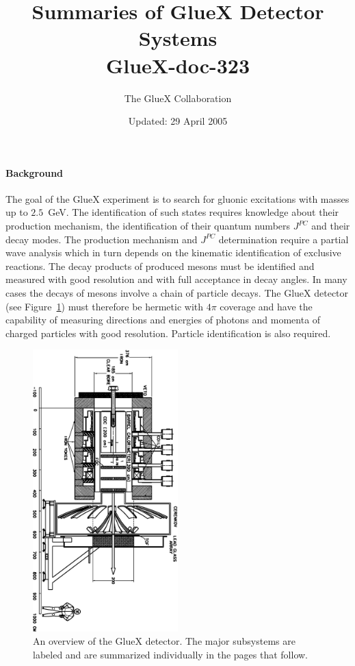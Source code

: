 
%
%
\title{Summaries of GlueX Detector Systems \\
\small{GlueX-doc-323} \\
}
%
\date{Updated: 29 April 2005}
%
\author{The GlueX Collaboration}
%

\maketitle
%
%
\paragraph{Background}
The goal of the GlueX experiment is to search for gluonic excitations
with masses up to $2.5$~GeV.  The identification of such states
requires knowledge about their production mechanism, the
identification of their quantum numbers $J^{PC}$ and their decay
modes. The production mechanism and $J^{PC}$ determination require a
partial wave analysis which in turn depends on the kinematic
identification of exclusive reactions. The decay products of produced
mesons must be identified and measured with good resolution and with
full acceptance in decay angles.  In many cases the decays of mesons
involve a chain of particle decays.  The GlueX detector (see
Figure~\ref{fig:ch6-hd_schematic}) must therefore be hermetic with 
$4\pi$ coverage and have the capability of measuring directions and
energies of photons and momenta of charged particles with good 
resolution.  Particle identification is also required.


\begin{figure}[t]
\centering
\includegraphics[width=0.50\textwidth,angle=90]{ch6_gluex_detector.eps}
\caption[An overview of the GlueX detector.]{\label{fig:ch6-hd_schematic}
An overview of the GlueX detector. The major subsystems are labeled and 
are summarized individually in the pages that follow. }
\end{figure}

